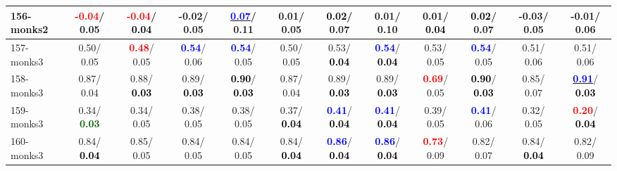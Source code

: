 \begin{table}[h]
\begin{center}
{\begin{tabular}{lc|c|c|c|c|c|c|c|c|c|c}
156-monks2 & \textcolor{red}{\textbf{ -0.04}}/  0.05 & \textcolor{red}{\textbf{ -0.04}}/\textcolor{black}{\textbf{  0.04}} &  -0.02/  0.05 & \underline{\textcolor{blue}{\textbf{  0.07}}}/  0.11 &   0.01/  0.05 & \textcolor{black}{\textbf{  0.02}}/  0.07 &   0.01/  0.10 &   0.01/\textcolor{black}{\textbf{  0.04}} & \textcolor{black}{\textbf{  0.02}}/  0.07 &  -0.03/  0.05 &  -0.01/  0.06 \\ \hline
157-monks3 &   0.50/  0.05 & \textcolor{red}{\textbf{  0.48}}/  0.05 & \textcolor{blue}{\textbf{  0.54}}/  0.06 & \textcolor{blue}{\textbf{  0.54}}/  0.05 &   0.50/  0.05 &   0.53/\textcolor{black}{\textbf{  0.04}} & \textcolor{blue}{\textbf{  0.54}}/\textcolor{black}{\textbf{  0.04}} &   0.53/  0.05 & \textcolor{blue}{\textbf{  0.54}}/  0.05 &   0.51/  0.06 &   0.51/  0.06 \\
158-monks3 &   0.87/  0.04 &   0.88/\textcolor{black}{\textbf{  0.03}} &   0.89/\textcolor{black}{\textbf{  0.03}} & \textcolor{black}{\textbf{  0.90}}/\textcolor{black}{\textbf{  0.03}} &   0.87/  0.04 &   0.89/\textcolor{black}{\textbf{  0.03}} &   0.89/\textcolor{black}{\textbf{  0.03}} & \textcolor{red}{\textbf{  0.69}}/  0.05 & \textcolor{black}{\textbf{  0.90}}/\textcolor{black}{\textbf{  0.03}} &   0.85/  0.07 & \underline{\textcolor{blue}{\textbf{  0.91}}}/\textcolor{black}{\textbf{  0.03}} \\
159-monks3 &   0.34/\textcolor{darkgreen}{\textbf{  0.03}} &   0.34/  0.05 &   0.38/  0.05 &   0.38/  0.05 &   0.37/\textcolor{black}{\textbf{  0.04}} & \textcolor{blue}{\textbf{  0.41}}/\textcolor{black}{\textbf{  0.04}} & \textcolor{blue}{\textbf{  0.41}}/\textcolor{black}{\textbf{  0.04}} &   0.39/  0.05 & \textcolor{blue}{\textbf{  0.41}}/  0.06 &   0.32/  0.05 & \textcolor{red}{\textbf{  0.20}}/\textcolor{black}{\textbf{  0.04}} \\
160-monks3 &   0.84/\textcolor{black}{\textbf{  0.04}} &   0.85/  0.05 &   0.84/  0.05 &   0.84/  0.05 &   0.84/\textcolor{black}{\textbf{  0.04}} & \textcolor{blue}{\textbf{  0.86}}/\textcolor{black}{\textbf{  0.04}} & \textcolor{blue}{\textbf{  0.86}}/\textcolor{black}{\textbf{  0.04}} & \textcolor{red}{\textbf{  0.73}}/  0.09 &   0.82/  0.07 &   0.84/\textcolor{black}{\textbf{  0.04}} &   0.82/  0.09 \\\end{tabular}}\label{stratsALCKappa4Allalla}
\end{center}
\end{table}
